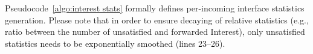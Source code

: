 


Pseudocode~\ref{algo:interest stats} formally defines per-incoming interface statistics generation.
Please note that in order to ensure decaying of relative statistics (e.g., ratio between the number of unsatisfied and forwarded Interest), only unsatisfied statistics needs to be exponentially smoothed (lines 23--26).  



